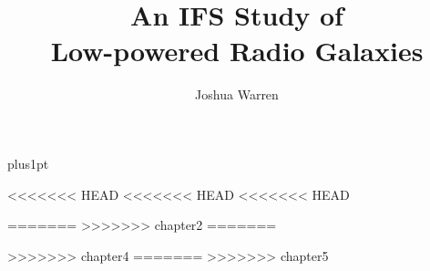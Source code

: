 \documentclass[12pt]{ociamthesis}  %
\title{An IFS Study of\\[1ex]     %
        Low-powered Radio Galaxies}   %
\author{Joshua Warren}             %
\begin{document}
\baselineskip=18pt plus1pt

\setcounter{secnumdepth}{3}
\setcounter{tocdepth}{3}


\maketitle                  %

\begin{romanpages}          %

	\tableofcontents            %
	\listoffigures              %
\end{romanpages}            %



<<<<<<< HEAD
<<<<<<< HEAD
<<<<<<< HEAD

=======
>>>>>>> chapter2
=======

>>>>>>> chapter4
=======
>>>>>>> chapter5




\appendix

% 

\end{document}
